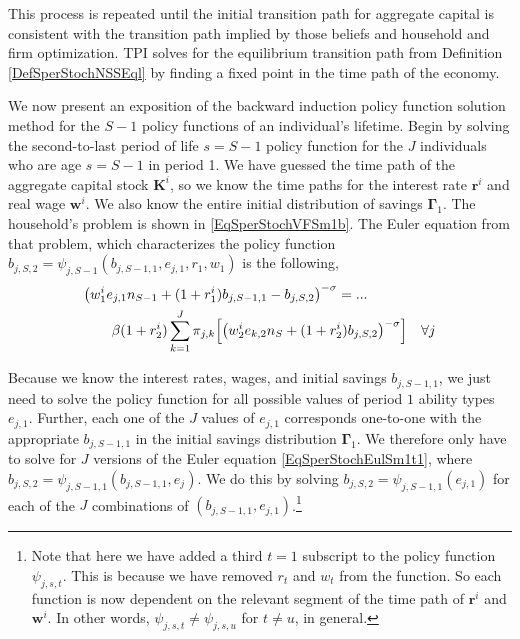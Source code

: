 \documentclass[letterpaper,12pt]{article}
\theoremstyle{definition}
\numberwithin{equation}{section}
\numberwithin{exercise}{section}
\begin{document}
\begin{spacing}{1.5}
      This process is repeated until the initial transition path for aggregate capital is consistent with the transition path implied by those beliefs and household and firm optimization. TPI solves for the equilibrium transition path from Definition \ref{DefSperStochNSSEql} by finding a fixed point in the time path of the economy.

      We now present an exposition of the backward induction policy function solution method for the $S-1$ policy functions of an individual's lifetime. Begin by solving the second-to-last period of life $s=S-1$ policy function for the $J$ individuals who are age $s=S-1$ in period 1. We have guessed the time path of the aggregate capital stock $\bm{K}^{i}$, so we know the time paths for the interest rate $\bm{r}^i$ and real wage $\bm{w}^i$. We also know the entire initial distribution of savings $\bm{\Gamma}_1$. The household's problem is shown in \eqref{EqSperStochVFSm1b}. The Euler equation from that problem, which characterizes the policy function $b_{j,S,2}=\psi_{j,S-1}\left(b_{j,S-1,1},e_{j,1},r_1,w_1\right)$ is the following,
      \begin{equation}\label{EqSperStochEulSm1t1}
         \begin{split}
            &\bigl(w_1^{i}e_{j,1}n_{S-1} + (1+r_1^i)b_{j,S-1,1} - b_{j,S,2}\bigr)^{-\sigma} = ... \\
            &\qquad \beta (1+r_2^i)\sum_{k=1}^J\pi_{j,k}\Bigl[\bigl(w_2^{i}e_{k,2}n_{S} + (1+r_2^i)b_{j,S,2}\bigr)^{-\sigma}\Bigr] \quad\forall j
         \end{split}
      \end{equation}

      Because we know the interest rates, wages, and initial savings $b_{j,S-1,1}$, we just need to solve the policy function for all possible values of period $1$ ability types $e_{j,1}$. Further, each one of the $J$ values of $e_{j,1}$ corresponds one-to-one with the appropriate $b_{j,S-1,1}$ in the initial savings distribution $\bm{\Gamma}_1$. We therefore only have to solve for $J$ versions of the Euler equation \eqref{EqSperStochEulSm1t1}, where $b_{j,S,2}=\psi_{j,S-1,1}\left(b_{j,S-1,1},e_{j}\right)$. We do this by solving $b_{j,S,2}=\psi_{j,S-1,1}\left(e_{j,1}\right)$ for each of the $J$ combinations of $\left(b_{j,S-1,1},e_{j,1}\right)$.\footnote{Note that here we have added a third $t=1$ subscript to the policy function $\psi_{j,s,t}$. This is because we have removed $r_t$ and $w_t$ from the function. So each function is now dependent on the relevant segment of the time path of $\bm{r}^i$ and $\bm{w}^i$. In other words, $\psi_{j,s,t}\neq\psi_{j,s,u}$ for $t\neq u$, in general.}


\end{spacing}
\end{document}
